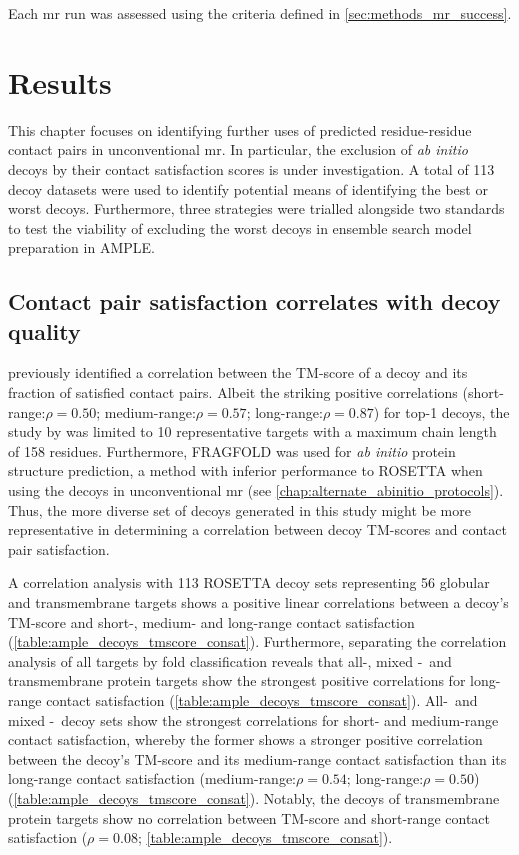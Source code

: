 Each \gls{mr} run was assessed using the criteria defined in \cref{sec:methods_mr_success}.

\section{Results}
This chapter focuses on identifying further uses of predicted residue-residue contact pairs in unconventional \gls{mr}. In particular, the exclusion of \textit{ab initio} decoys by their contact satisfaction scores is under investigation. A total of 113 decoy datasets were used to identify potential means of identifying the best or worst decoys. Furthermore, three strategies were trialled alongside two standards to test the viability of excluding the worst decoys in ensemble search model preparation in AMPLE.

\subsection{Contact pair satisfaction correlates with decoy quality}
\textcite{Kosciolek2014-bt} previously identified a correlation between the TM-score of a decoy and its fraction of satisfied contact pairs. Albeit the striking positive correlations (short-range:$\rho=0.50$; medium-range:$\rho=0.57$; long-range:$\rho=0.87$) for top-1 decoys, the study by \textcite{Kosciolek2014-bt} was limited to 10 representative targets with a maximum chain length of 158 residues. Furthermore, FRAGFOLD \cite{Jones2001-mc} was used for \textit{ab initio} protein structure prediction, a method with inferior performance to ROSETTA \cite{Rohl2004-dj} when using the decoys in unconventional \gls{mr} (see \cref{chap:alternate_abinitio_protocols}). Thus, the more diverse set of decoys generated in this study might be more representative in determining a correlation between decoy TM-scores and contact pair satisfaction.

A correlation analysis with 113 ROSETTA decoy sets representing 56 globular and transmembrane targets shows a positive linear correlations between a decoy's TM-score and short-, medium- and long-range contact satisfaction (\cref{table:ample_decoys_tmscore_consat}). Furthermore, separating the correlation analysis of all targets by fold classification reveals that all-\textalpha, mixed \textalpha-\textbeta\ and transmembrane protein targets show the strongest positive correlations for long-range contact satisfaction (\cref{table:ample_decoys_tmscore_consat}). All-\textbeta\ and mixed \textalpha-\textbeta\ decoy sets show the strongest correlations for short- and medium-range contact satisfaction, whereby the former shows a stronger positive correlation between the decoy's TM-score and its medium-range contact satisfaction than its long-range contact satisfaction (medium-range:$\rho=0.54$; long-range:$\rho=0.50$) (\cref{table:ample_decoys_tmscore_consat}). Notably, the decoys of transmembrane protein targets show no correlation between TM-score and short-range contact satisfaction ($\rho=0.08$; \cref{table:ample_decoys_tmscore_consat}).


